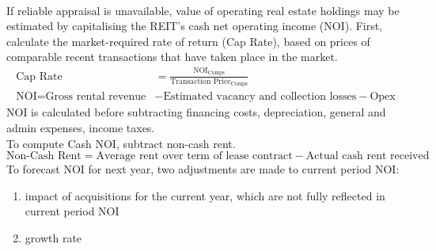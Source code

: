 \begin{method} \\
If reliable appraisal is unavailable, value of operating real estate holdings may be estimated by capitalising the REIT's cash net operating income (NOI).
First, calculate the market-required rate of return (Cap Rate), based on prices of comparable recent transactions that have taken place in the market.
\begin{align}
\text{Cap Rate} &= \frac{\text{NOI}_{\text{Comps}}}{\text{Transaction Price}_{\text{Comps}}} \nonumber \\
\text{NOI} = \text{Gross rental revenue} &- \text{Estimated vacancy and collection losses} - \text{Opex} \nonumber
\end{align}
NOI is calculated before subtracting financing costs, depreciation, general and admin expenses, income taxes.\\
To compute Cash NOI, subtract non-cash rent.
\begin{equation}
\text{Non-Cash Rent} = \text{Average rent over term of lease contract} - \text{Actual cash rent received} \nonumber
\end{equation}
To forecast NOI for next year, two adjustments are made to current period NOI:
\begin{enumerate}[label=\roman*.]
\setlength{\itemsep}{0pt}
\item impact of acquisitions for the current year, which are not fully reflected in current period NOI
\item growth rate
\end{enumerate}
\end{method}

